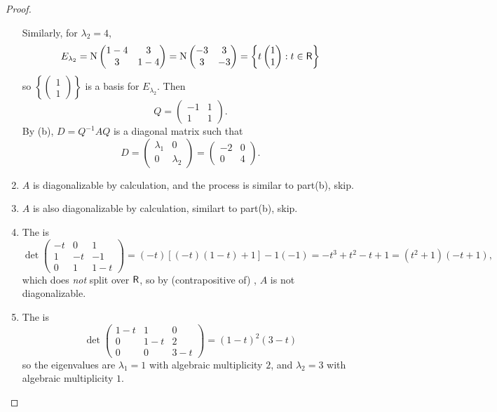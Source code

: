 \begin{proof}
\begin{enumerate}
Similarly, for \(\lambda_2 = 4\),
\[
    E_{\lambda_2} = \mathrm{N} \begin{pmatrix} 1 - 4 & 3 \\ 3 & 1 - 4 \end{pmatrix} = \mathrm{N} \begin{pmatrix} -3 & 3 \\ 3 & -3 \end{pmatrix} = \left\{ t \begin{pmatrix} 1 \\ 1 \end{pmatrix} : t \in \textsf{R} \right\}
\]
so \(\left\{ \begin{pmatrix} 1 \\ 1 \end{pmatrix} \right\}\) is a basis for \(E_{\lambda_2}\).
Then
\[
    Q = \begin{pmatrix} -1 & 1 \\ 1 & 1 \end{pmatrix}.
\]
By (b), \(D = Q^{-1} A Q\) is a diagonal matrix such that
\[
    D = \begin{pmatrix} \lambda_1 & 0 \\ 0 & \lambda_2 \end{pmatrix} = \begin{pmatrix} -2 & 0 \\ 0 & 4 \end{pmatrix}.
\]

\item \(A\) is diagonalizable by calculation, and the process is similar to part(b), skip.

\item \(A\) is also diagonalizable by calculation, similart to part(b), skip.

\item The \CPOLY{} is
\[
    \det \begin{pmatrix} -t & 0 & 1 \\ 1 & -t & -1 \\ 0 & 1 & 1 - t \end{pmatrix} = (-t)\left[ (-t)(1 - t) + 1 \right] - 1(-1) = -t^3 + t^2 - t + 1 = (t^2 + 1)(-t + 1),
\]
which does \emph{not} split over \(\textsf{R}\), so by (contrapositive of) , \(A\) is not diagonalizable.

\item The \CPOLY{} is
\[
    \det \begin{pmatrix} 1-t & 1 & 0 \\ 0 & 1-t & 2 \\ 0 & 0 & 3-t \end{pmatrix} = (1-t)^2(3-t)
\]
so the eigenvalues are \(\lambda_1 = 1\) with algebraic multiplicity \(2\), and \(\lambda_2 = 3\) with algebraic multiplicity \(1\).


\end{enumerate}
\end{proof}
